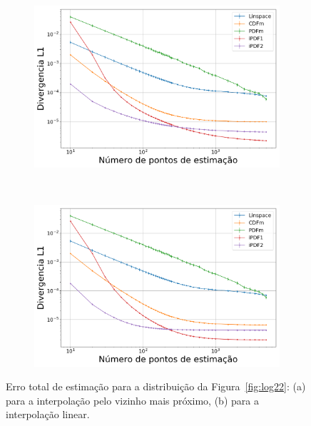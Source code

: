 \begin{figure}[H]
	\centering
	\begin{subfigure}[b]{0.45\textwidth}
		\centering 
		\includegraphics[width=\textwidth]{./figuras/ERRORPLOT_L1_FALSE_LOGNORMAL_NEAREST_100000_2}
		\caption{}
		\label{fig:error_near_log22}
	\end{subfigure}
	\hfill
	~ %
	\begin{subfigure}[b]{0.45\textwidth}
		\centering 
		\includegraphics[width=\textwidth]{./figuras/ERRORPLOT_L1_FALSE_LOGNORMAL_LINEAR_100000_2}
		\caption{}
		\label{fig:error_lin_log22}
	\end{subfigure}
	\caption{Erro total de estimação para a distribuição da Figura~\ref{fig:log22}: (a) para a interpolação pelo vizinho mais próximo, (b) para a interpolação linear.}
	\label{fig:Error_log22}
\end{figure}

